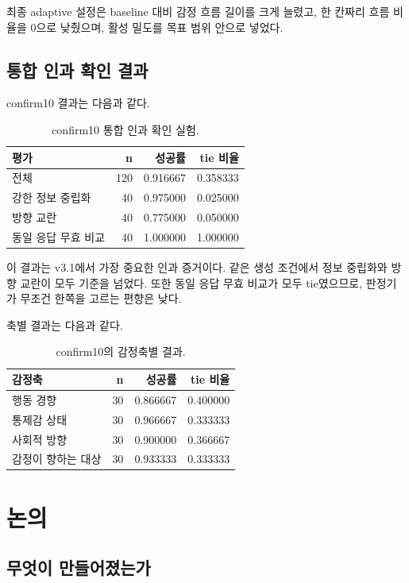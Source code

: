 \documentclass[11pt,a4paper]{article}
\begin{document}
최종 adaptive 설정은 baseline 대비 감정 흐름 길이를 크게 늘렸고, 한 칸짜리 흐름 비율을 0으로 낮췄으며, 활성 밀도를 목표 범위 안으로 넣었다.

\subsection{통합 인과 확인 결과}

confirm10 결과는 다음과 같다.

\begin{table}[h]
\centering
\small
\begin{tabular}{lrrr}
\toprule
평가 & n & 성공률 & tie 비율 \\
\midrule
전체 & 120 & 0.916667 & 0.358333 \\
강한 정보 중립화 & 40 & 0.975000 & 0.025000 \\
방향 교란 & 40 & 0.775000 & 0.050000 \\
동일 응답 무효 비교 & 40 & 1.000000 & 1.000000 \\
\bottomrule
\end{tabular}
\caption{confirm10 통합 인과 확인 실험.}
\label{tab:confirm10}
\end{table}

이 결과는 v3.1에서 가장 중요한 인과 증거이다. 같은 생성 조건에서 정보 중립화와 방향 교란이 모두 기준을 넘었다. 또한 동일 응답 무효 비교가 모두 tie였으므로, 판정기가 무조건 한쪽을 고르는 편향은 낮다.

축별 결과는 다음과 같다.

\begin{table}[h]
\centering
\small
\begin{tabular}{lrrr}
\toprule
감정축 & n & 성공률 & tie 비율 \\
\midrule
행동 경향 & 30 & 0.866667 & 0.400000 \\
통제감 상태 & 30 & 0.966667 & 0.333333 \\
사회적 방향 & 30 & 0.900000 & 0.366667 \\
감정이 향하는 대상 & 30 & 0.933333 & 0.333333 \\
\bottomrule
\end{tabular}
\caption{confirm10의 감정축별 결과.}
\label{tab:confirm10-axis}
\end{table}

\section{논의}

\subsection{무엇이 만들어졌는가}
\end{document}

